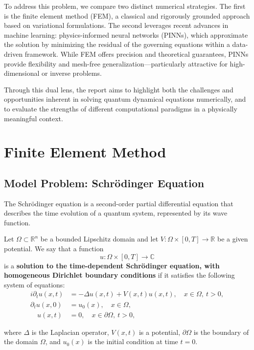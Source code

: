 \documentclass{article}
\theoremstyle{definition}
\theoremstyle{plain}
\theoremstyle{remark}
\begin{document}
To address this problem, we compare two distinct numerical strategies. The first is the finite element method (FEM), a classical and rigorously grounded approach based on variational formulations. The second leverages recent advances in machine learning: physics-informed neural networks (PINNs), which approximate the solution by minimizing the residual of the governing equations within a data-driven framework. While FEM offers precision and theoretical guarantees, PINNs provide flexibility and mesh-free generalization—particularly attractive for high-dimensional or inverse problems.

Through this dual lens, the report aims to highlight both the challenges and opportunities inherent in solving quantum dynamical equations numerically, and to evaluate the strengths of different computational paradigms in a physically meaningful context.

\newpage

\section{Finite Element Method}

\subsection*{Model Problem: Schrödinger Equation}

The Schrödinger equation is a second-order partial differential equation that describes the time evolution of a quantum system, represented by its wave function.

Let $\Omega \subset \mathbb{R}^n$ be a bounded Lipschitz domain and let $V : \Omega \times [0,T] \to \mathbb{R}$ be a given potential. We say that a function
\[
u : \Omega \times [0,T] \to \mathbb{C}
\]
is a \textbf{solution to the time-dependent Schrödinger equation, with homogeneous Dirichlet boundary conditions} if it satisfies the following system of equations:
\begin{align*}
    i \partial_t u(x,t) &= - \Delta u(x,t) + V(x,t) u(x,t), \quad x \in \Omega, \ t > 0,\\
    \partial_t u(x,0) &= u_0(x), \quad x \in \Omega,\\
    \quad u(x,t) &= 0, \quad x \in \partial \Omega, \ t > 0,
\end{align*}


where $\Delta$ is the Laplacian operator, $V(x,t)$ is a potential, $\partial \Omega$ is the boundary of the domain $\Omega$, and $u_0(x)$ is the initial condition at time $t=0$. 
\end{document}
